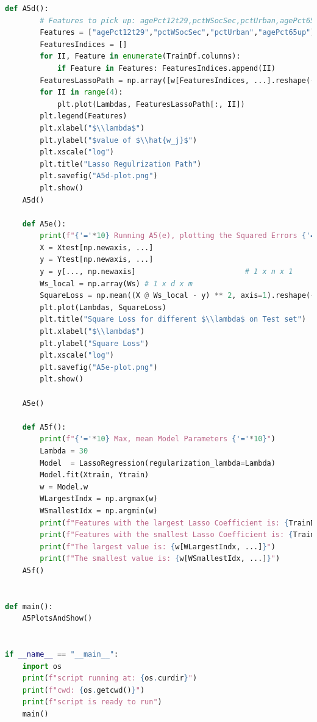 \documentclass[]{article}
\begin{document}
\begin{lstlisting}[language=python]
    def A5d():
        # Features to pick up: agePct12t29,pctWSocSec,pctUrban,agePct65up
        Features = ["agePct12t29","pctWSocSec","pctUrban","agePct65up"]
        FeaturesIndices = []
        for II, Feature in enumerate(TrainDf.columns):
            if Feature in Features: FeaturesIndices.append(II)
        FeaturesLassoPath = np.array([w[FeaturesIndices, ...].reshape(-1) for w in Ws])
        for II in range(4):
            plt.plot(Lambdas, FeaturesLassoPath[:, II])
        plt.legend(Features)
        plt.xlabel("$\\lambda$")
        plt.ylabel("$value of $\\hat{w_j}$")
        plt.xscale("log")
        plt.title("Lasso Regulrization Path")
        plt.savefig("A5d-plot.png")
        plt.show()
    A5d()

    def A5e():
        print(f"{'='*10} Running A5(e), plotting the Squared Errors {'='*10}")
        X = Xtest[np.newaxis, ...]
        y = Ytest[np.newaxis, ...]
        y = y[..., np.newaxis]                         # 1 x n x 1
        Ws_local = np.array(Ws) # 1 x d x m
        SquareLoss = np.mean((X @ Ws_local - y) ** 2, axis=1).reshape(-1)
        plt.plot(Lambdas, SquareLoss)
        plt.title("Square Loss for different $\\lambda$ on Test set")
        plt.xlabel("$\\lambda$")
        plt.ylabel("Square Loss")
        plt.xscale("log")
        plt.savefig("A5e-plot.png")
        plt.show()

    A5e()

    def A5f():
        print(f"{'='*10} Max, mean Model Parameters {'='*10}")
        Lambda = 30
        Model  = LassoRegression(regularization_lambda=Lambda)
        Model.fit(Xtrain, Ytrain)
        w = Model.w
        WLargestIndx = np.argmax(w)
        WSmallestIdx = np.argmin(w)
        print(f"Features with the largest Lasso Coefficient is: {TrainDf.columns[WLargestIndx]}")
        print(f"Features with the smallest Lasso Coefficient is: {TrainDf.columns[WSmallestIdx]}")
        print(f"The largest value is: {w[WLargestIndx, ...]}")
        print(f"The smallest value is: {w[WSmallestIdx, ...]}")
    A5f()


def main():
    A5PlotsAndShow()


if __name__ == "__main__":
    import os
    print(f"script running at: {os.curdir}")
    print(f"cwd: {os.getcwd()}")
    print(f"script is ready to run")
    main()
        \end{lstlisting}
            
\end{document}
